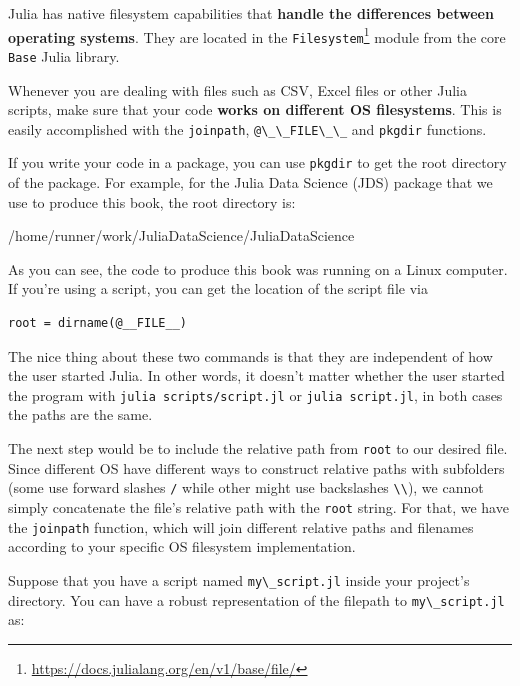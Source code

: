 \documentclass[
  notoc %
]{tufte-book}
\DeclareRobustCommand{\href}[2]{#2\footnote{\url{#1}}}
\newcommand{\passthrough}[1]{#1}
\begin{document}
Julia has native filesystem capabilities that \textbf{handle the
differences between operating systems}. They are located in the
\href{https://docs.julialang.org/en/v1/base/file/}{\passthrough{\lstinline!Filesystem!}}
module from the core \passthrough{\lstinline!Base!} Julia library.

Whenever you are dealing with files such as CSV, Excel files or other
Julia scripts, make sure that your code \textbf{works on different OS
filesystems}. This is easily accomplished with the
\passthrough{\lstinline!joinpath!},
\passthrough{\lstinline!@\_\_FILE\_\_!} and
\passthrough{\lstinline!pkgdir!} functions.

If you write your code in a package, you can use
\passthrough{\lstinline!pkgdir!} to get the root directory of the
package. For example, for the Julia Data Science (JDS) package that we
use to produce this book, the root directory is:

/home/runner/work/JuliaDataScience/JuliaDataScience

As you can see, the code to produce this book was running on a Linux
computer. If you're using a script, you can get the location of the
script file via

\begin{lstlisting}
root = dirname(@__FILE__)
\end{lstlisting}

The nice thing about these two commands is that they are independent of
how the user started Julia. In other words, it doesn't matter whether
the user started the program with
\passthrough{\lstinline!julia scripts/script.jl!} or
\passthrough{\lstinline!julia script.jl!}, in both cases the paths are
the same.

The next step would be to include the relative path from
\passthrough{\lstinline!root!} to our desired file. Since different OS
have different ways to construct relative paths with subfolders (some
use forward slashes \passthrough{\lstinline!/!} while other might use
backslashes \passthrough{\lstinline!\\!}), we cannot simply concatenate
the file's relative path with the \passthrough{\lstinline!root!} string.
For that, we have the \passthrough{\lstinline!joinpath!} function, which
will join different relative paths and filenames according to your
specific OS filesystem implementation.

Suppose that you have a script named
\passthrough{\lstinline!my\_script.jl!} inside your project's directory.
You can have a robust representation of the filepath to
\passthrough{\lstinline!my\_script.jl!} as:
\end{document}
